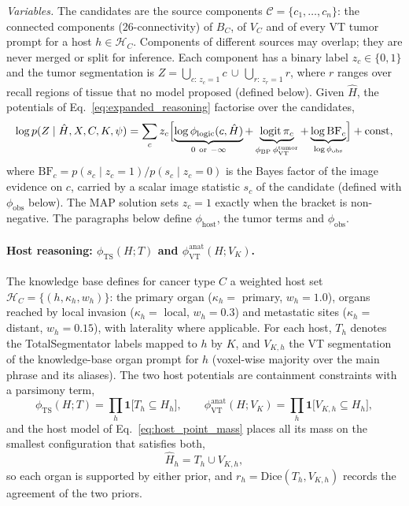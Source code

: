 \documentclass[fleqn,10pt]{olplainarticle}
\begin{document}
\textit{Variables.} The candidates are the source components $\mathcal{C}=\{c_1,\dots,c_n\}$: the connected components
(26-connectivity) of $B_C$, of $V_C$ and of every VT tumor prompt for a host $h\in\mathcal{H}_C$. Components of different
sources may overlap; they are never merged or split for inference. Each component has a binary label $z_c\in\{0,1\}$ and
the tumor segmentation is $Z=\bigcup_{c:\,z_c=1}c\,\cup\,\bigcup_{r:\,z_r=1}r$, where $r$ ranges over recall regions of
tissue that no model proposed (defined below). Given $\hat H$, the potentials of Eq.~\eqref{eq:expanded_reasoning}
factorise over the candidates,
\begin{equation}
\label{eq:part_posterior}
\log p(Z\mid \hat H,X,C,K,\psi) = \sum_{c} z_c\Bigl[\underbrace{\log\phi_{\mathrm{logic}}(c,\hat H)}_{0\ \text{or}\ -\infty}
+\underbrace{\operatorname{logit}\pi_c}_{\phi_{\mathrm{BP}}\,\phi^{\mathrm{tumor}}_{\mathrm{VT}}}
+\underbrace{\log \mathrm{BF}_c}_{\log\phi_{\mathrm{obs}}}\Bigr] + \mathrm{const},
\end{equation}
where $\mathrm{BF}_c=p(s_c\mid z_c=1)/p(s_c\mid z_c=0)$ is the Bayes factor of the image evidence on $c$, carried by a
scalar image statistic $s_c$ of the candidate (defined with $\phi_{\mathrm{obs}}$ below). The MAP solution sets
$z_c=1$ exactly when the bracket is non-negative. The paragraphs below define $\phi_{\mathrm{host}}$, the tumor terms and
$\phi_{\mathrm{obs}}$.

\paragraph{Host reasoning: $\phi_{\mathrm{TS}}(H;T)$ and $\phi^{\mathrm{anat}}_{\mathrm{VT}}(H;V_K)$.}
The knowledge base defines for cancer type $C$ a weighted host set $\mathcal{H}_C=\{(h,\kappa_h,w_h)\}$: the primary organ
($\kappa_h=$ primary, $w_h=1.0$), organs reached by local invasion ($\kappa_h=$ local, $w_h=0.3$) and metastatic sites
($\kappa_h=$ distant, $w_h=0.15$), with laterality where applicable. For each host, $T_h$ denotes the TotalSegmentator
labels mapped to $h$ by $K$, and $V_{K,h}$ the VT segmentation of the knowledge-base organ prompt for $h$ (voxel-wise
majority over the main phrase and its aliases). The two host potentials are containment constraints with a parsimony
term,
\begin{equation}
\label{eq:host_potentials}
\phi_{\mathrm{TS}}(H;T)=\prod_{h}\mathbf{1}\bigl[T_h\subseteq H_h\bigr],\qquad
\phi^{\mathrm{anat}}_{\mathrm{VT}}(H;V_K)=\prod_{h}\mathbf{1}\bigl[V_{K,h}\subseteq H_h\bigr],
\end{equation}
and the host model of Eq.~\eqref{eq:host_point_mass} places all its mass on the smallest configuration that satisfies
both,
\begin{equation}
\label{eq:host_map}
\hat H_h = T_h\cup V_{K,h},
\end{equation}
so each organ is supported by either prior, and $r_h=\mathrm{Dice}(T_h,V_{K,h})$ records the agreement of the two priors.
\end{document}
